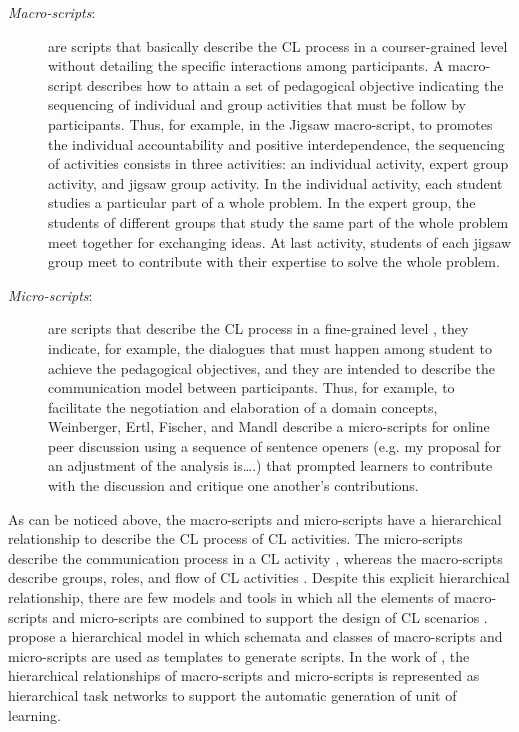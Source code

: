 \begin{description}
\item[\emph{Macro-scripts}:] are scripts that basically describe the CL process in a courser-grained level without detailing the specific interactions among participants. A macro-script describes how to attain a set of pedagogical objective indicating the sequencing of individual and group activities that must be follow by participants. Thus, for example, in the Jigsaw macro-script, to promotes the individual accountability and positive interdependence, the sequencing of activities consists in three activities: an individual activity, expert group activity, and jigsaw group activity. In the individual activity, each student studies a particular part of a whole problem. In the expert group, the students of different groups that study the same part of the whole problem meet together for exchanging ideas. At last activity, students of each jigsaw group meet to contribute with their expertise to solve the whole problem.

\item[\emph{Micro-scripts}:] are scripts that describe the CL process in a fine-grained level \cite{WeinbergerFischerStegmann2005}, they indicate, for example, the dialogues that must happen among student to achieve the pedagogical objectives, and they are intended to describe the communication model between participants. Thus, for example, to facilitate the negotiation and elaboration of a domain concepts, Weinberger, Ertl, Fischer, and Mandl  \cite{WeinbergerErtlFischerMandl2005} describe a micro-scripts for online peer discussion using a sequence of sentence openers (e.g. my proposal for an adjustment of the analysis is….) that prompted learners to contribute with the discussion and critique one another's contributions.
\end{description}

As can be noticed above, the macro-scripts and micro-scripts have a hierarchical relationship to describe the CL process of CL activities. The micro-scripts describe the communication process in a CL activity \cite{WeinbergerFischerStegmann2005}, whereas the macro-scripts describe groups, roles, and flow of CL activities \cite{DillenbourgHong2008}. Despite this explicit hierarchical relationship, there are few models and tools in which all the elements of macro-scripts and micro-scripts are combined to support the design of CL scenarios \cite{AlharbiAthaudaChiong2014, ChallcoBittencourtIsotani2016}.  propose a hierarchical model in which schemata and classes of macro-scripts and micro-scripts are used as templates to generate scripts. In the work of , the hierarchical relationships of macro-scripts and micro-scripts is represented as hierarchical task networks to support the automatic generation of unit of learning.

